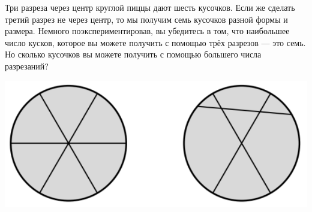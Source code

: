 \documentclass[10pt]{scrbook} \usepackage{modules/nonstahp_book}
\begin{document}

Три разреза через центр круглой пиццы дают шесть кусочков. Если же сделать третий разрез не через центр, то мы получим семь кусочков разной формы и размера. Немного поэкспериментировав, вы убедитесь в том, что наибольшее число кусков, которое вы можете получить с помощью трёх разрезов --- это семь. Но сколько кусочков вы можете получить с помощью большего числа разрезаний?
\begin{center}
\includegraphics[width=0.85\linewidth]{PizzaC.png}
\end{center}
\end{document}
